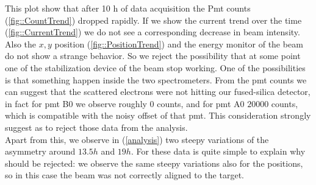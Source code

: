 \begin{figure}[hbtp]
\centering
{}
\end{figure}

This plot show that after 10 h of data acquisition the Pmt counts (\ref{fig::CountTrend}) dropped rapidly. If we show the current trend over the time (\ref{fig::CurrentTrend}) we do not see a corresponding decrease in beam intensity. Also the $x,y$ position (\ref{fig::PositionTrend}) and the energy monitor of the beam do not show a strange behavior. So we reject the possibility that at some point one of the stabilization device of the beam stop working. One of the possibilities is that something happen inside the two spectrometers. From the pmt counts we can suggest that the scattered electrons were not hitting our fused-silica detector,
in fact for pmt B0 we observe roughly 0 counts, and for pmt A0 $20000$ counts, which is compatible with the noisy offset of that pmt. This consideration strongly suggest as to reject those data from the analysis.\\
Apart from this, we observe in (\ref{analysis}) two steepy variations of the asymmetry around $13.5 h$ and $19 h$. For these data is quite simple to explain why should be rejected: we observe the same steepy variations also for the positions, so in this case the beam was not correctly aligned to the target.

